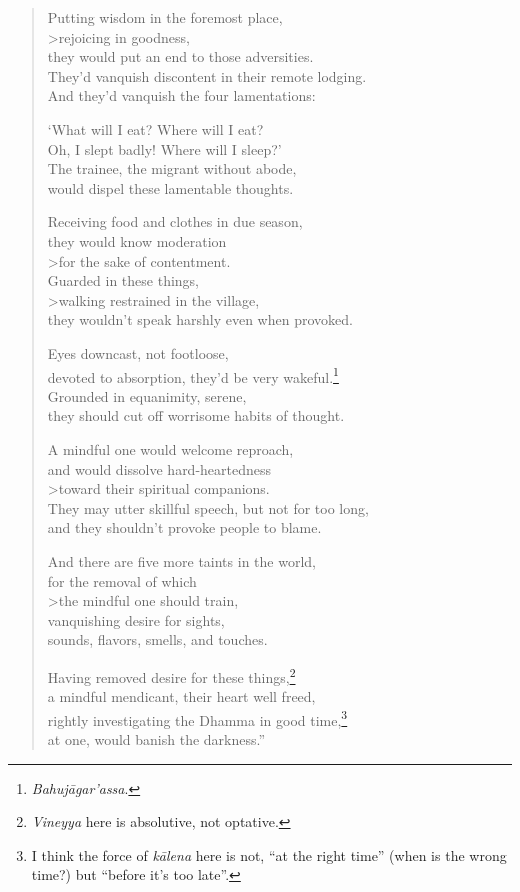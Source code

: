 \documentclass[12pt,openany]{book}%
\begin{document}
\begin{verse}
Putting wisdom in the foremost place, \\>rejoicing in goodness, \\
they would put an end to those adversities. \\
They’d vanquish discontent in their remote lodging. \\
And they’d vanquish the four lamentations: 

‘What will I eat? Where will I eat? \\
Oh, I slept badly! Where will I sleep?’ \\
The trainee, the migrant without abode, \\
would dispel these lamentable thoughts. 

Receiving food and clothes in due season, \\
they would know moderation \\>for the sake of contentment. \\
Guarded in these things, \\>walking restrained in the village, \\
they wouldn’t speak harshly even when provoked. 

Eyes downcast, not footloose, \\
devoted to absorption, they’d be very wakeful.\footnote{\textit{\textsanskrit{Bahujāgar}’assa}. } \\
Grounded in equanimity, serene, \\
they should cut off worrisome habits of thought. 

A mindful one would welcome reproach, \\
and would dissolve hard-heartedness \\>toward their spiritual companions. \\
They may utter skillful speech, but not for too long, \\
and they shouldn’t provoke people to blame. 

And there are five more taints in the world, \\
for the removal of which \\>the mindful one should train, \\
vanquishing desire for sights, \\
sounds, flavors, smells, and touches. 

Having removed desire for these things,\footnote{\textit{Vineyya} here is absolutive, not optative. } \\
a mindful mendicant, their heart well freed, \\
rightly investigating the Dhamma in good time,\footnote{I think the force of \textit{\textsanskrit{kālena}} here is not, “at the right time” (when is the wrong time?) but “before it’s too late”. } \\
at one, would banish the darkness.” 

%
\end{verse}
\end{document}
